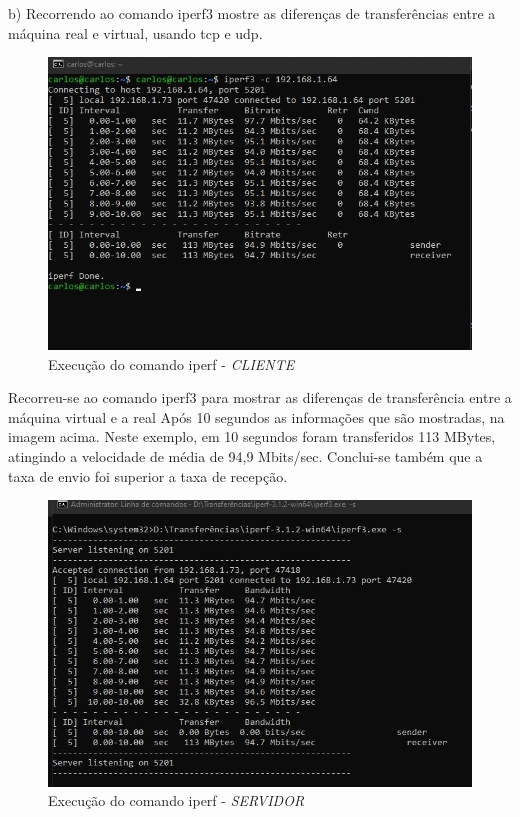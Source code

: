 \documentclass{article}
\begin{document}
	\newpage
	b) Recorrendo ao comando iperf3 mostre as diferenças de transferências entre a
	máquina real e virtual, usando tcp e udp.
	
	\begin{figure}[!htb]
		\centering
		\includegraphics[scale=0.5]{tp_sosd_b1.1}
		\caption{Execução do comando iperf - \textit{CLIENTE}}
	\end{figure}
	
	Recorreu-se ao comando iperf3 para mostrar as diferenças de transferência entre a máquina virtual e a real  
	Após 10 segundos as informações que são mostradas, na imagem acima. Neste exemplo, em 10 segundos foram transferidos 113 MBytes, atingindo a velocidade de média de 94,9 Mbits/sec. Conclui-se também que a taxa de envio foi superior a taxa de recepção.

	\vspace{1 em}
	\begin{figure}[!htb]
		\centering
		\includegraphics[scale=0.5]{tp_sosd_b1.2}
		\caption{Execução do comando iperf - \textit{SERVIDOR}}
	\end{figure}
\end{document}
